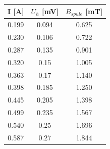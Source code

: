 \begin{minipage}[h]{0.35\linewidth}

\begin{tabular}{|c|c|c|}
\hline 
I [A] & $U_h$ [mV] & $B_{spule}$ [mT] \\ 
\hline 
0.199 & 0.094 & 0.625
 \\ 
\hline 
0.230 & 0.106 & 0.722
 \\ 
\hline 
0.287 & 0.135 & 0.901
 \\ 
\hline 
0.320 & 0.15 & 1.005
 \\ 
\hline 
0.363 & 0.17 & 1.140
 \\ 
\hline 
0.398 & 0.185 & 1.250
 \\ 
\hline 
0.445 & 0.205 & 1.398
 \\ 
\hline 
0.499 & 0.235 & 1.567
 \\ 
\hline 
0.540 & 0.25 & 1.696
 \\ 
\hline 
0.587 & 0.27 & 1.844
 \\ 
\hline 
\end{tabular} 
\label{tab:eichspule}
\end{minipage}
\hfill
